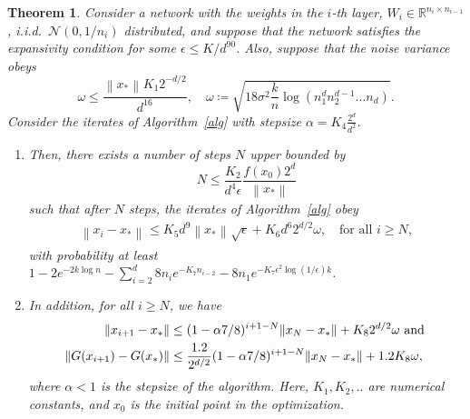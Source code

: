 \documentclass[11pt]{article}
\newtheorem{theorem}{Theorem} %
\newcommand{\R}{\mathbb{R}}
\newcommand{\eps}{\epsilon}
\newcommand{\red}[1]{{\color{red} #1}}
\newcommand{\blue}[1]{{\color{blue} #1}}
\newcommand{\xo}{x_\ast}
\DeclareMathOperator{\poly}{poly}
\newcommand\defeq{\coloneqq}
\newcommand{\Tnorm}{}
\newcommand\norm[2][\Tnorm]{\ensuremath{{\left\|#2\right\|}_{#1}}}
\newcommand\setS{\mathcal S}
\newcommand{\rhcomment}[1]{{\bf{{\blue{{RH --- #1}}}}}}
\begin{document}
\begin{theorem}
\label{thm:main}
Consider a network with the weights in the $i$-th layer, $W_i \in \R^{n_i \times n_{i-1}}$, i.i.d.~$\mathcal N(0,1/n_i)$ distributed, and suppose that the network satisfies the expansivity condition for some $\epsilon \leq K/d^{90}$. %
Also, suppose that the noise variance obeys
\[
\omega \leq \frac{\norm{\xo} K_1 2^{-d/2} }{d^{16}},
\quad
\omega
\defeq
\sqrt{ 18\sigma^2 \frac{k}{n}
\log(n_1^d n_2^{d-1}\ldots n_d)}.
\]
Consider the iterates of Algorithm~\ref{alg} with stepsize
$\alpha = K_4\frac{2^d}{d^2}$.
\begin{enumerate}
\item[A.]
Then, there exists a number of steps $N$ upper bounded by
\[
N
\leq
\frac{K_2}{d^4\eps}
\frac{f(x_0) 2^d}{ \norm{\xo}}
\]
such that after $N$ steps, the iterates of Algorithm~\ref{alg} obey
\begin{align}
\label{eq:errorxixo}
\norm{x_i -\xo}
\leq
K_5 d^9 \norm{\xo} \sqrt{\epsilon}
+
K_6 d^6 2^{d/2} \omega,
\quad
\text{for all $i \geq N$},
\end{align}
with probability at least
$1-2e^{-2k \log n} - \sum_{i=2}^d 8 n_i e^{-K_7 n_{i-2} }
- 8 n_1 e^{-K_7 \epsilon^{2} \log(1/\epsilon) k }
$.
%
\item[B.]
In addition, for all $i \geq N$, we have
\begin{align}
\|x_{i + 1} - x_*\| &\leq (1 - \alpha 7/8)^{i + 1 - N} \|x_N - x_*\| + K_8 2^{d/2} \omega \hbox{ and }  \label{GA:e68:2} \\
\|G(x_{i + 1}) - G(x_*)\| &\leq \frac{1.2}{2^{d/2}} (1 - \alpha 7/8)^{i + 1 - N} \|x_N - x_*\| + 1.2 K_8 \omega, \label{GA:e74:2}
\end{align}
where $\alpha < 1$ is the stepsize of the algorithm.
Here, $K_1,K_2,..$ are numerical constants, and $x_0$ is the initial point in the optimization.
\end{enumerate}
\end{theorem}
\end{document}
